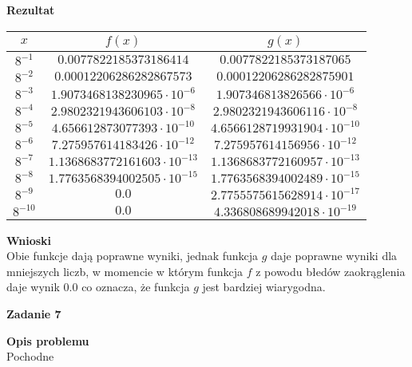 \documentclass{article}
\begin{document}
\noindent \textbf{Rezultat}

\begin{center}
	\begin{tabular}{|c|c|c|}
		\hline
		\textbf{$x$} & \textbf{$f(x)$}                   & \textbf{$g(x)$}                   \\
		\hline
		$8^{-1}$     & $0.0077822185373186414$           & $0.0077822185373187065$           \\
		\hline
		$8^{-2}$     & $0.00012206286282867573$          & $0.00012206286282875901$          \\
		\hline
		$8^{-3}$     & $1.9073468138230965\cdot10^{-6}$  & $1.907346813826566\cdot10^{-6}$   \\
		\hline
		$8^{-4}$     & $2.9802321943606103\cdot10^{-8}$  & $2.9802321943606116\cdot10^{-8}$  \\
		\hline
		$8^{-5}$     & $4.656612873077393\cdot10^{-10}$  & $4.6566128719931904\cdot10^{-10}$ \\
		\hline
		$8^{-6}$     & $7.275957614183426\cdot10^{-12}$  & $7.275957614156956\cdot10^{-12}$  \\
		\hline
		$8^{-7}$     & $1.1368683772161603\cdot10^{-13}$ & $1.1368683772160957\cdot10^{-13}$ \\
		\hline
		$8^{-8}$     & $1.7763568394002505\cdot10^{-15}$ & $1.7763568394002489\cdot10^{-15}$ \\
		\hline
		$8^{-9}$     & $0.0$                             & $2.7755575615628914\cdot10^{-17}$ \\
		\hline
		$8^{-10}$    & $0.0$                             & $4.336808689942018\cdot10^{-19}$  \\
		\hline
	\end{tabular}
\end{center}

\noindent \textbf{Wnioski} \\
Obie funkcje dają poprawne wyniki, jednak funkcja $g$ daje poprawne wyniki dla mniejszych
liczb, w momencie w którym funkcja $f$ z powodu błedów zaokrąglenia daje wynik $0.0$
co oznacza, że funkcja $g$ jest bardziej wiarygodna.
\pagebreak


\noindent \textbf{\large Zadanie 7}

\noindent \textbf{Opis problemu} \\
Pochodne
\end{document}
